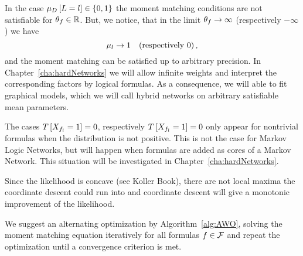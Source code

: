 In the case $\mu_{D}\left[L=l\right]\in\{0,1\}$ the moment matching conditions are not satisfiable for $\theta_{f}\in\mathbb{R}$.
But, we notice, that in the limit $\theta_{f}\rightarrow \infty $ (respectively $-\infty$) we have
	\[ \mu_{l} \rightarrow  1 \quad \text{(respectively $0$)}\, ,  \]
and the moment matching can be satisfied up to arbitrary precision.
In Chapter~\ref{cha:hardNetworks} we will allow infinite weights and interpret the corresponding factors by logical formulas.
As a consequence, we will able to fit graphical models, which we will call hybrid networks on arbitrary satisfiable mean parameters.

%
The cases $T\left[X_{f_{l}}=1\right]=0$, respectively $T\left[X_{f_{l}}=1\right]=0$ only appear for nontrivial formulas when the distribution is not positive. 
This is not the case for Markov Logic Networks, but will happen when formulas are added as cores of a Markov Network.
This situation will be investigated in Chapter~\ref{cha:hardNetworks}.


Since the likelihood is concave (see Koller Book), there are not local maxima the coordinate descent could run into and coordinate descent will give a monotonic improvement of the likelihood. 

We suggest an alternating optimization by Algorithm~\ref{alg:AWO}, solving the moment matching equation iteratively for all formulas $f\in\mathcal{F}$ and repeat the optimization until a convergence criterion is met.


